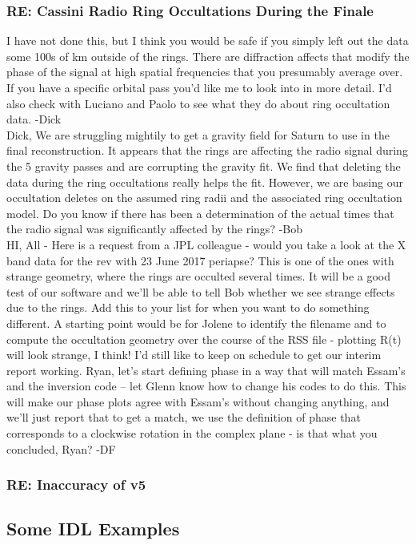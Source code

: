 \documentclass[crop=false,class=book]{standalone}
\begin{document}
\subsubsection{\footnotesize RE: Cassini Radio Ring Occultations During the Finale}
I have not done this, but I think you would be safe if you simply left out the data some 100s of km outside of the rings. There are diffraction affects that modify the phase of the signal at high spatial frequencies that you presumably average over. If you have a specific orbital pass you'd like me to look into in more detail. I'd also check with Luciano and Paolo to see what they do about ring occultation data. -Dick\\
Dick, We are struggling mightily to get a gravity field for Saturn to use in the final reconstruction. It appears that the rings are affecting the radio signal during the 5 gravity passes and are corrupting the gravity fit. We find that deleting the data during the ring occultations really helps the fit. However, we are basing our occultation deletes on the assumed ring radii and the associated ring occultation model. Do you know if there has been a determination of the actual times that the radio signal was significantly affected by the rings? -Bob\\
HI, All - Here is a request from a JPL colleague - would you take a look at the X band data for the rev with 23 June 2017 periapse? This is one of the ones with strange geometry, where the rings are occulted several times. It will be a good test of our software and we'll be able to tell Bob whether we see strange effects due to the rings. Add this to your list for when you want to do something different. A starting point would be for Jolene to identify the filename and to compute the occultation geometry over the course of the RSS file - plotting R(t) will look strange, I think! I'd still like to keep on schedule to get our interim report working. Ryan, let's start defining phase in a way that will match Essam's and the inversion code -- let Glenn know how to change his codes to do this. This will make our phase plots agree with Essam's without changing anything, and we'll just report that to get a match, we use the definition of phase that corresponds to a clockwise rotation in the complex plane - is that what you concluded, Ryan? -DF
\subsubsection{\footnotesize RE: Inaccuracy of v5}
\subsection{Some IDL Examples}
\end{document}
